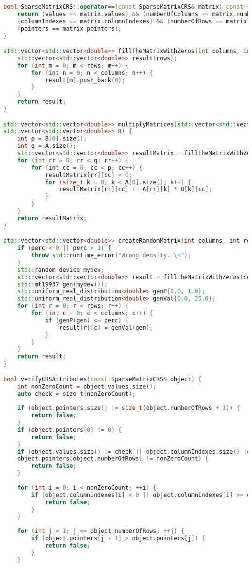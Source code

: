 \documentclass[a4paper, 14pt]{article}
\newcommand{\n}{\par}
\theoremstyle{plain}
\begin{document}
\begin{lstlisting}[language=C++,caption=Файл sparse\_matmult\_crs.cpp]
bool SparseMatrixCRS::operator==(const SparseMatrixCRS& matrix) const {
	return (values == matrix.values) && (numberOfColumns == matrix.numberOfColumns) &&
	(columnIndexes == matrix.columnIndexes) && (numberOfRows == matrix.numberOfRows) &&
	(pointers == matrix.pointers);
}

std::vector<std::vector<double>> fillTheMatrixWithZeros(int columns, int rows) {
	std::vector<std::vector<double>> result(rows);
	for (int m = 0; m < rows; m++) {
		for (int n = 0; n < columns; n++) {
			result[m].push_back(0);
		}
	}
	return result;
}

std::vector<std::vector<double>> multiplyMatrices(std::vector<std::vector<double>> A,
std::vector<std::vector<double>> B) {
	int p = B[0].size();
	int q = A.size();
	std::vector<std::vector<double>> resultMatrix = fillTheMatrixWithZeros(p, q);
	for (int rr = 0; rr < q; rr++) {
		for (int cc = 0; cc < p; cc++) {
			resultMatrix[rr][cc] = 0;
			for (size_t k = 0; k < A[0].size(); k++) {
				resultMatrix[rr][cc] += A[rr][k] * B[k][cc];
			}
		}
	}
	return resultMatrix;
}

std::vector<std::vector<double>> createRandomMatrix(int columns, int rows, double perc) {
	if (perc < 0 || perc > 1) {
		throw std::runtime_error("Wrong density. \n");
	}
	std::random_device mydev;
	std::vector<std::vector<double>> result = fillTheMatrixWithZeros(columns, rows);
	std::mt19937 gen(mydev());
	std::uniform_real_distribution<double> genP{0.0, 1.0};
	std::uniform_real_distribution<double> genVal{0.0, 25.0};
	for (int r = 0; r < rows; r++) {
		for (int c = 0; c < columns; c++) {
			if (genP(gen) <= perc) {
				result[r][c] = genVal(gen);
			}
		}
	}
	return result;
}

bool verifyCRSAttributes(const SparseMatrixCRS& object) {
	int nonZeroCount = object.values.size();
	auto check = size_t(nonZeroCount);
	
	if (object.pointers.size() != size_t(object.numberOfRows + 1)) {
		return false;
	}
	if (object.pointers[0] != 0) {
		return false;
	}
	if (object.values.size() != check || object.columnIndexes.size() != check ||
	object.pointers[object.numberOfRows] != nonZeroCount) {
		return false;
	}
	
	for (int i = 0; i < nonZeroCount; ++i) {
		if (object.columnIndexes[i] < 0 || object.columnIndexes[i] >= object.numberOfColumns) {
			return false;
		}
	}
	
	for (int j = 1; j <= object.numberOfRows; ++j) {
		if (object.pointers[j - 1] > object.pointers[j]) {
			return false;
		}
	}
	

\end{lstlisting}
\end{document}
